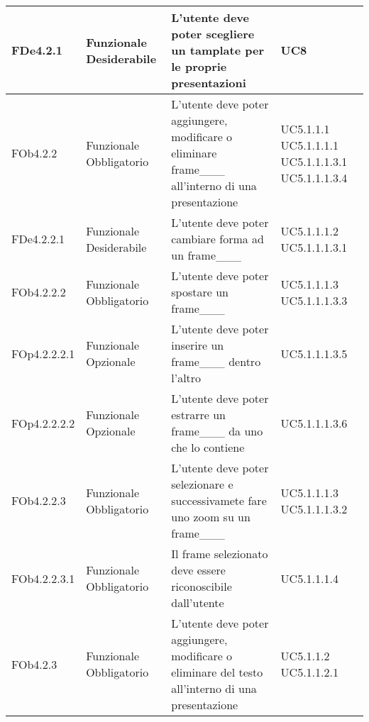 \begin{longtable}{|l|p{2.5cm}|p{5cm}|p{3.5cm}|}
\hline
FDe4.2.1 & Funzionale \linebreak Desiderabile & L'utente deve poter scegliere un tamplate per le proprie presentazioni & UC8 \linebreak  \\
\hline
FOb4.2.2 & Funzionale \linebreak Obbligatorio & L'utente deve poter aggiungere, modificare o eliminare frame___ all'interno di una presentazione & UC5.1.1.1 \linebreak  UC5.1.1.1.1 \linebreak  UC5.1.1.1.3.1 \linebreak  UC5.1.1.1.3.4 \linebreak  \\
\hline
FDe4.2.2.1 & Funzionale \linebreak Desiderabile & L'utente deve poter cambiare forma ad un frame___ & UC5.1.1.1.2 \linebreak  UC5.1.1.1.3.1 \linebreak  \\
\hline
FOb4.2.2.2 & Funzionale \linebreak Obbligatorio & L'utente deve poter spostare un frame___ & UC5.1.1.1.3 \linebreak  UC5.1.1.1.3.3 \linebreak  \\
\hline
FOp4.2.2.2.1 & Funzionale \linebreak Opzionale & L'utente deve poter inserire un frame___ dentro l'altro  & UC5.1.1.1.3.5 \linebreak  \\
\hline
FOp4.2.2.2.2 & Funzionale \linebreak Opzionale & L'utente deve poter estrarre un frame___ da uno che lo contiene & UC5.1.1.1.3.6 \linebreak  \\
\hline
FOb4.2.2.3 & Funzionale \linebreak Obbligatorio & L'utente deve poter selezionare e successivamete fare uno zoom su un frame___ & UC5.1.1.1.3 \linebreak  UC5.1.1.1.3.2 \linebreak  \\
\hline
FOb4.2.2.3.1 & Funzionale \linebreak Obbligatorio & Il frame selezionato deve essere riconoscibile dall'utente & UC5.1.1.1.4 \linebreak  \\
\hline
FOb4.2.3 & Funzionale \linebreak Obbligatorio & L'utente deve poter aggiungere, modificare o eliminare del testo all'interno di una presentazione  & UC5.1.1.2 \linebreak  UC5.1.1.2.1 \linebreak  \\

\end{longtable}
